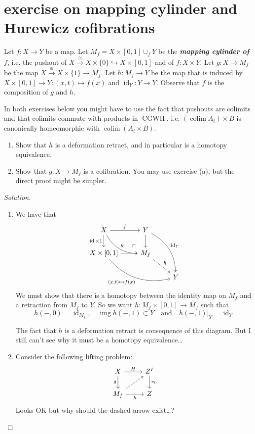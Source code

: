 \documentclass{article}
\numberwithin{equation}{section}
\DeclareMathOperator{\img}{img}
\DeclareMathOperator{\id}{id}
\DeclareMathOperator{\CGWH}{CGWH}
\DeclareMathOperator{\colim}{colim}
\begin{document}
\section{exercise on mapping cylinder and Hurewicz cofibrations}
\begin{exercise}
	Let $f:X\to Y$ be a map. Let $M_f=X\times[0,1]\cup_fY$ be the \textbf{\textit{mapping cylinder of $f$}}, i.e. the pushout of $X\overset{\cong}{\to}X\times\{0\}\hookrightarrow X\times[0,1]$ and of $f:X\times Y$.
	Let $g:X\to M_f$ be the map $X\overset{\cong}{\to}X\times\{1\}\to M_f$. Let $h:M_f\to Y$ be the map that is induced by $X\times[0,1]\to Y:(x,t)\mapsto f(x)$ and $\id_Y:Y\to Y$. Observe that $f$ is the composition of $g$ and $h$.
	
	In both exercises below you might have to use the fact that pushouts are colimits and that colimits commute with products in $\CGWH$, i.e. $(\colim A_i)\times B$ is canonically homeomorphic with $\colim(A_i \times B)$.
	\begin{enumerate}
		\item Show that $h$ is a deformation retract, and in particular is a homotopy equivalence.
		\item Show that $g : X \to M_f$ is a cofibration. You may use exercise (a), but the direct proof might be simpler.
	\end{enumerate}
\end{exercise}
\begin{proof}[Solution]\leavevmode
	\begin{enumerate}
		\item We have that
		\[\begin{tikzcd}
			X\arrow[r,"f"]\arrow[d,swap,"\id\times 1"]\arrow[rd,bend right,"g"]&Y\arrow[d]\arrow[ddr,bend left,"\id_Y"]\\
			X\times[0,1]\arrow[r,swap]\arrow[drr,bend right,swap,"(x\text{,}t)\mapsto f(x)"]&M_f\arrow[ul, phantom, "\ulcorner", very near start]\arrow[dr,dashed,"h"]\\
			&&Y
		\end{tikzcd}\]
		We must show that there is a homotopy between the identity map on $M_f$ and a retraction from $M_f$ to $Y$. So we want $h:M_f\times[0,1]\to M_f$ such that
		\[h(-,0)=\id_{M_f},\quad \img h(-,1)\subset Y\quad\text{and}\quad h(-,1)|_Y=\id_Y\]
		
		The fact that $h$ is a deformation retract is consequence of this diagram. {\color{red}But I still can't see why it must be a homotopy equivalence…}
		\item Consider the following lifting problem:
		\[\begin{tikzcd}
			X\arrow[d,"g",swap]\arrow[r,"H"]&Z^I\arrow[d,"\pi_0"]\\
			M_f\arrow[ur,dashed]\arrow[r,"h",swap]&Z
		\end{tikzcd}\]
		{\color{red}Looks OK but why should the dashed arrow exist…?}
	\end{enumerate}
\end{proof}
\clearpage
\end{document}
